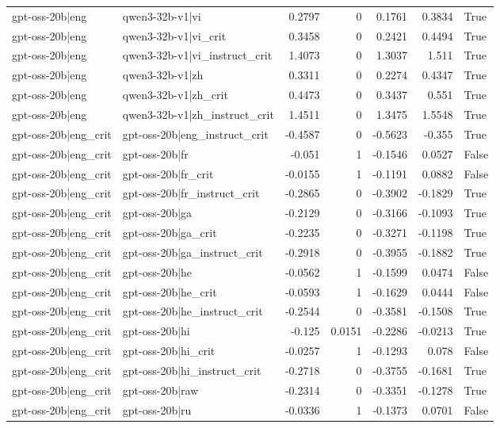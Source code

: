 \begin{table}
\begin{tabular}{l l r r r r l}
gpt-oss-20b|eng & qwen3-32b-v1|vi & 0.2797 & 0 & 0.1761 & 0.3834 & True \\
gpt-oss-20b|eng & qwen3-32b-v1|vi_crit & 0.3458 & 0 & 0.2421 & 0.4494 & True \\
gpt-oss-20b|eng & qwen3-32b-v1|vi_instruct_crit & 1.4073 & 0 & 1.3037 & 1.511 & True \\
gpt-oss-20b|eng & qwen3-32b-v1|zh & 0.3311 & 0 & 0.2274 & 0.4347 & True \\
gpt-oss-20b|eng & qwen3-32b-v1|zh_crit & 0.4473 & 0 & 0.3437 & 0.551 & True \\
gpt-oss-20b|eng & qwen3-32b-v1|zh_instruct_crit & 1.4511 & 0 & 1.3475 & 1.5548 & True \\
gpt-oss-20b|eng_crit & gpt-oss-20b|eng_instruct_crit & -0.4587 & 0 & -0.5623 & -0.355 & True \\
gpt-oss-20b|eng_crit & gpt-oss-20b|fr & -0.051 & 1 & -0.1546 & 0.0527 & False \\
gpt-oss-20b|eng_crit & gpt-oss-20b|fr_crit & -0.0155 & 1 & -0.1191 & 0.0882 & False \\
gpt-oss-20b|eng_crit & gpt-oss-20b|fr_instruct_crit & -0.2865 & 0 & -0.3902 & -0.1829 & True \\
gpt-oss-20b|eng_crit & gpt-oss-20b|ga & -0.2129 & 0 & -0.3166 & -0.1093 & True \\
gpt-oss-20b|eng_crit & gpt-oss-20b|ga_crit & -0.2235 & 0 & -0.3271 & -0.1198 & True \\
gpt-oss-20b|eng_crit & gpt-oss-20b|ga_instruct_crit & -0.2918 & 0 & -0.3955 & -0.1882 & True \\
gpt-oss-20b|eng_crit & gpt-oss-20b|he & -0.0562 & 1 & -0.1599 & 0.0474 & False \\
gpt-oss-20b|eng_crit & gpt-oss-20b|he_crit & -0.0593 & 1 & -0.1629 & 0.0444 & False \\
gpt-oss-20b|eng_crit & gpt-oss-20b|he_instruct_crit & -0.2544 & 0 & -0.3581 & -0.1508 & True \\
gpt-oss-20b|eng_crit & gpt-oss-20b|hi & -0.125 & 0.0151 & -0.2286 & -0.0213 & True \\
gpt-oss-20b|eng_crit & gpt-oss-20b|hi_crit & -0.0257 & 1 & -0.1293 & 0.078 & False \\
gpt-oss-20b|eng_crit & gpt-oss-20b|hi_instruct_crit & -0.2718 & 0 & -0.3755 & -0.1681 & True \\
gpt-oss-20b|eng_crit & gpt-oss-20b|raw & -0.2314 & 0 & -0.3351 & -0.1278 & True \\
gpt-oss-20b|eng_crit & gpt-oss-20b|ru & -0.0336 & 1 & -0.1373 & 0.0701 & False \\

\end{tabular}
\end{table}
